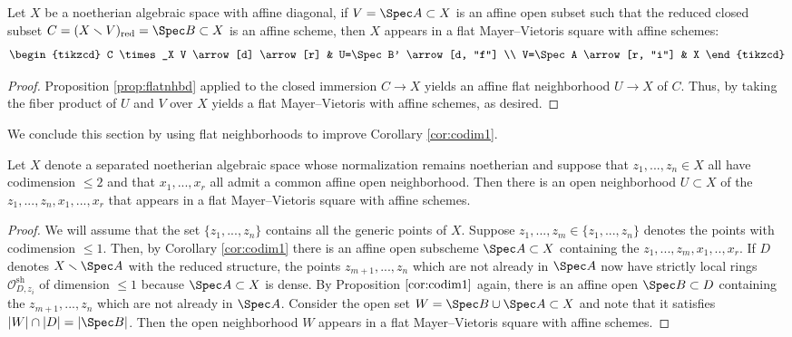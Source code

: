 \documentclass[12pt]{amsart}
\begin{document}
\begin{corollary} \label{cor:mvsquaresexist} Let $X$ be a noetherian algebraic space with affine diagonal, if $V=\Spec A \subset X$ is an affine open subset such that the reduced closed subset $C=(X \smallsetminus V)_{\mathrm{red}}=\Spec B \subset X$ is an affine scheme, then $X$ appears in a flat Mayer--Vietoris square with affine schemes:
\[\begin{tikzcd}
  C \times_X V \arrow[d] \arrow[r] & U=\Spec B' \arrow[d, "f"]  \\
  V=\Spec A \arrow[r, "i"] &  X
  \end{tikzcd}
\]
\end{corollary}

\begin{proof} Proposition \ref{prop:flatnhbd} applied to the closed immersion $C \to X$ yields an affine flat neighborhood $U \to X$ of $C$. Thus, by taking the fiber product of $U$ and $V$ over $X$ yields a flat Mayer--Vietoris with affine schemes, as desired. \end{proof}

We conclude this section by using flat neighborhoods to improve Corollary \ref{cor:codim1}. 

\begin{proposition} \label{prop:affineMV} Let $X$ denote a separated noetherian algebraic space whose normalization remains noetherian and suppose that $z_1,...,z_n \in X$ all have codimension $\leq 2$ and that $x_1,...,x_r$ all admit a common affine open neighborhood. Then there is an open neighborhood $U \subset X$ of the $z_1,...,z_n,x_1,...,x_r$ that appears in a flat Mayer--Vietoris square with affine schemes. \end{proposition}

\begin{proof} We will assume that the set $\{z_1,...,z_n\}$ contains all the generic points of $X$. Suppose $z_1,...,z_m \in \{z_1,...,z_n\}$ denotes the points with codimension $\leq 1$. Then, by Corollary \ref{cor:codim1} there is an affine open subscheme $\Spec A \subset X$ containing the $z_1,...,z_m,x_1,..,x_r$. If $D$ denotes $X \smallsetminus \Spec A$ with the reduced structure, the points $z_{m+1},...,z_n$ which are not already in $\Spec A$ now have strictly local rings $\mathcal{O}^{\text{sh}}_{D,z_i}$ of dimension $\leq 1$ because $\Spec A \subset X$ is dense. By Proposition $\ref{cor:codim1}$ again, there is an affine open $\Spec B \subset D$ containing the $z_{m+1},...,z_n$ which are not already in $\Spec A$. Consider the open set $W=\Spec B \cup \Spec A \subset X$ and note that it satisfies $|W| \cap |D|=|\Spec B|$. Then the open neighborhood $W$ appears in a flat Mayer--Vietoris square with affine schemes. \end{proof}
\end{document}
